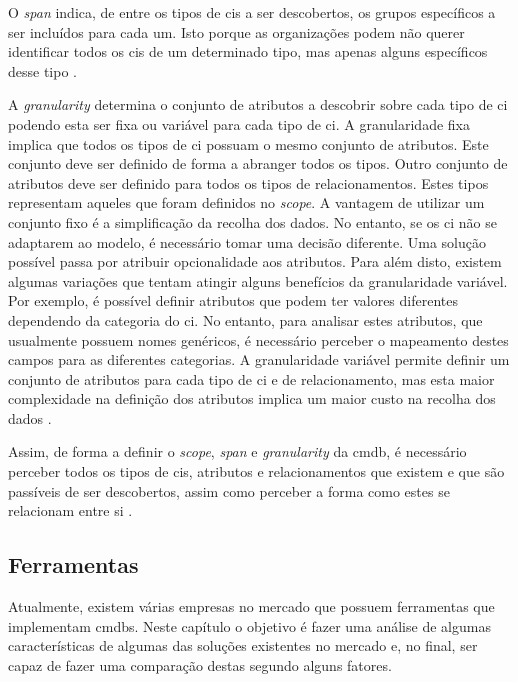 \documentclass[
  oneside,
  11pt, a4paper,
  footinclude=true,
  headinclude=true,
  cleardoublepage=empty
]{scrbook}
\begin{document}
O \textit{span} indica, de entre os tipos de \glspl{ci} a ser descobertos, os grupos específicos a ser incluídos para cada um. Isto porque as organizações podem não querer identificar todos os \glspl{ci} de um determinado tipo, mas apenas alguns específicos desse tipo \cite{implementingitil}.

A \textit{granularity} determina o conjunto de atributos a descobrir sobre cada tipo de \gls{ci} podendo esta ser fixa ou variável para cada tipo de \gls{ci}. A granularidade fixa implica que todos os tipos de \Gls{ci} possuam o mesmo conjunto de atributos. Este conjunto deve ser definido de forma a abranger todos os tipos. Outro conjunto de atributos deve ser definido para todos os tipos de relacionamentos. Estes tipos representam aqueles que foram definidos no \textit{scope}. A vantagem de utilizar um conjunto fixo é a simplificação da recolha dos dados. No entanto, se os \gls{ci} não se adaptarem ao modelo, é necessário tomar uma decisão diferente. Uma solução possível passa por atribuir opcionalidade aos atributos. Para além disto, existem algumas variações que tentam atingir alguns benefícios da granularidade variável. Por exemplo, é possível definir atributos que podem ter valores diferentes dependendo da categoria do \gls{ci}. No entanto, para analisar estes atributos, que usualmente possuem nomes genéricos, é necessário perceber o mapeamento destes campos para as diferentes categorias. A granularidade variável permite definir um conjunto de atributos para cada tipo de \gls{ci} e de relacionamento, mas esta maior complexidade na definição dos atributos implica um maior custo na recolha dos dados \cite{implementingitil}.

Assim, de forma a definir o \textit{scope}, \textit{span} e \textit{granularity} da \gls{cmdb}, é necessário perceber todos os tipos de \glspl{ci}, atributos e relacionamentos que existem e que são passíveis de ser descobertos, assim como perceber a forma como estes se relacionam entre si \cite{kyurkchievlogical}.

\subsection{Ferramentas}

Atualmente, existem várias empresas no mercado que possuem ferramentas que implementam \glspl{cmdb}. Neste capítulo o objetivo é fazer uma análise de algumas características de algumas das soluções existentes no mercado e, no final, ser capaz de fazer uma comparação destas segundo alguns fatores.
\end{document}
